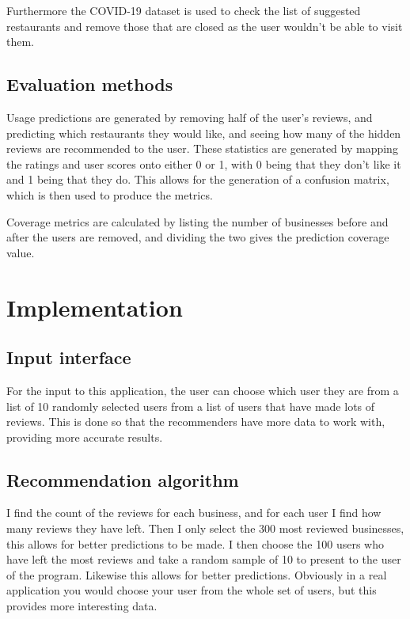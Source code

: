 \documentclass[conference]{IEEEtran}
\begin{document}
Furthermore the COVID-19 dataset is used to check the list of suggested restaurants and remove those that are closed as the user wouldn't be able to visit them.

\subsection{Evaluation methods}

Usage predictions are generated by removing half of the user's reviews, and predicting which restaurants they would like, and seeing how many of the hidden reviews are recommended to the user. These statistics are generated by mapping the ratings and user scores onto either 0 or 1, with 0 being that they don't like it and 1 being that they do. This allows for the generation of a confusion matrix, which is then used to produce the metrics.

Coverage metrics are calculated by listing the number of businesses before and after the users are removed, and dividing the two gives the prediction coverage value.


\section{Implementation}

\subsection{Input interface}

For the input to this application, the user can choose which user they are from a list of 10 randomly selected users from a list of users that have made lots of reviews. This is done so that the recommenders have more data to work with, providing more accurate results.

\subsection{Recommendation algorithm}

I find the count of the reviews for each business, and for each user I find how many reviews they have left. Then I only select the 300 most reviewed businesses, this allows for better predictions to be made. I then choose the 100 users who have left the most reviews and take a random sample of 10 to present to the user of the program. Likewise this allows for better predictions. Obviously in a real application you would choose your user from the whole set of users, but this provides more interesting data.
\end{document}
